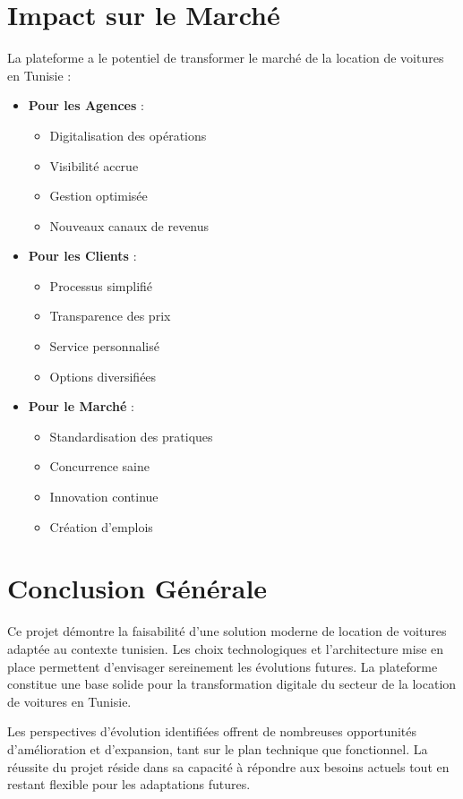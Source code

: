 \section{Impact sur le Marché}
La plateforme a le potentiel de transformer le marché de la location de voitures en Tunisie :

\begin{itemize}
    \item \textbf{Pour les Agences} :
    \begin{itemize}
        \item Digitalisation des opérations
        \item Visibilité accrue
        \item Gestion optimisée
        \item Nouveaux canaux de revenus
    \end{itemize}
    
    \item \textbf{Pour les Clients} :
    \begin{itemize}
        \item Processus simplifié
        \item Transparence des prix
        \item Service personnalisé
        \item Options diversifiées
    \end{itemize}
    
    \item \textbf{Pour le Marché} :
    \begin{itemize}
        \item Standardisation des pratiques
        \item Concurrence saine
        \item Innovation continue
        \item Création d'emplois
    \end{itemize}
\end{itemize}

\section{Conclusion Générale}
Ce projet démontre la faisabilité d'une solution moderne de location de voitures adaptée au contexte tunisien. Les choix technologiques et l'architecture mise en place permettent d'envisager sereinement les évolutions futures. La plateforme constitue une base solide pour la transformation digitale du secteur de la location de voitures en Tunisie.

Les perspectives d'évolution identifiées offrent de nombreuses opportunités d'amélioration et d'expansion, tant sur le plan technique que fonctionnel. La réussite du projet réside dans sa capacité à répondre aux besoins actuels tout en restant flexible pour les adaptations futures.
